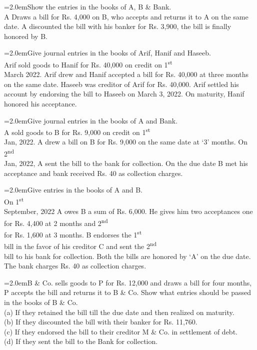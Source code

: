 \documentclass[11pt,a4paper]{article}
\newcommand{\lqn}[2]{\Needspace{6\baselineskip}\par\medskip\noindent\hangindent=2.0em\hangafter=1\makebox[2.0em][l]{\textbf{#1.}}#2\par}
\begin{document}
\lqn{29}{Show the entries in the books of A, B \& Bank.\\
A Draws a bill for Rs. 4,000 on B, who accepts and returns it to A on the same date. A discounted the bill with his banker for Rs. 3,900, the bill is finally honored by B.\par
}
\lqn{30}{Give journal entries in the books of Arif, Hanif and Haseeb.\\
Arif sold goods to Hanif for Rs. 40,000 on credit on 1\textsuperscript{st}\\
March 2022. Arif drew and Hanif accepted a bill for Rs. 40,000 at three months on the same date. Haseeb was creditor of Arif for Rs. 40,000. Arif settled his account by endorsing the bill to Haseeb on March 3, 2022. On maturity, Hanif honored his acceptance.\par
}
\lqn{31}{Give journal entries in the books of A and Bank.\\
A sold goods to B for Rs. 9,000 on credit on 1\textsuperscript{st}\\
Jan, 2022. A drew a bill on B for Rs. 9,000 on the same date at ‘3’ months. On 2\textsuperscript{nd}\\
Jan, 2022, A sent the bill to the bank for collection. On the due date B met his acceptance and bank received Rs. 40 as collection charges.\par
}
\lqn{32}{Give entries in the books of A and B.\\
On 1\textsuperscript{st}\\
September, 2022 A owes B a sum of Rs. 6,000. He gives him two acceptances one for Rs. 4,400 at 2 months and 2\textsuperscript{nd}\\
for Rs. 1,600 at 3 months. B endorses the 1\textsuperscript{st}\\
bill in the favor of his creditor C and sent the 2\textsuperscript{nd}\\
bill to his bank for collection. Both the bills are honored by ‘A’ on the due date. The bank charges Rs. 40 as collection charges.\par
}
\lqn{33}{B \& Co. sells goods to P for Rs. 12,000 and draws a bill for four months, P accepts the bill and returns it to B \& Co. Show what entries should be passed in the books of B \& Co.\\
(a) If they retained the bill till the due date and then realized on maturity.\\
(b) If they discounted the bill with their banker for Rs. 11,760.\\
(c) If they endorsed the bill to their creditor M \& Co. in settlement of debt.\\
(d) If they sent the bill to the Bank for collection.\par
}
\end{document}
